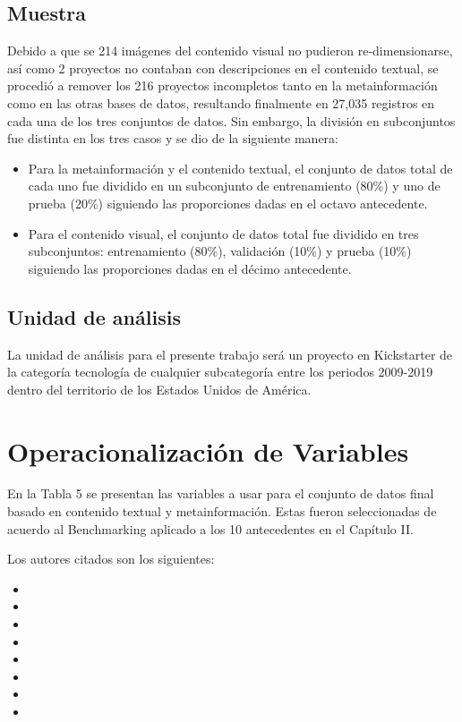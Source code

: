 \subsection{Muestra}
Debido a que se 214 imágenes del contenido visual no pudieron re-dimensionarse, así como 2 proyectos no contaban con descripciones en el contenido textual, se procedió a remover los 216 proyectos incompletos tanto en la metainformación como en las otras bases de datos, resultando finalmente en 27,035 registros en cada una de los tres conjuntos de datos. Sin embargo, la división en subconjuntos fue distinta en los tres casos y se dio de la siguiente manera:

\begin{itemize}
	\item Para la metainformación y el contenido textual, el conjunto de datos total de cada uno fue dividido en un subconjunto de entrenamiento (80\%) y uno de prueba (20\%) siguiendo las proporciones dadas en el octavo antecedente.
	\item Para el contenido visual, el conjunto de datos total fue dividido en tres subconjuntos: entrenamiento (80\%), validación (10\%) y prueba (10\%) siguiendo las proporciones dadas en el décimo antecedente.
\end{itemize}

\subsection{Unidad de análisis}
La unidad de análisis para el presente trabajo será un proyecto en Kickstarter de la categoría tecnología de cualquier subcategoría entre los periodos 2009-2019 dentro del territorio de los Estados Unidos de América.

\section{Operacionalización de Variables}
En la Tabla 5 se presentan las variables a usar para el conjunto de datos final basado en contenido textual y metainformación. Estas fueron seleccionadas de acuerdo al Benchmarking aplicado a los 10 antecedentes en el Capítulo II.

Los autores citados son los siguientes:
\begin{itemize}
	\item 
	\item 
	\item 
	\item 
	\item 
	\item 
	\item 
	\item 
\end{itemize}

